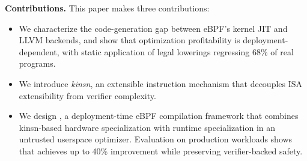 \noindent\textbf{Contributions.}
This paper makes three contributions:
\begin{itemize}
    \item We characterize the code-generation gap between eBPF's kernel JIT and LLVM backends, and show that optimization profitability is deployment-dependent, with static application of legal lowerings regressing 68\% of real programs.
    \item We introduce \emph{kinsn}, an extensible instruction mechanism that decouples ISA extensibility from verifier complexity.
    \item We design \tool, a deployment-time eBPF compilation framework that combines kinsn-based hardware specialization with runtime specialization in an untrusted userspace optimizer. Evaluation on production workloads shows that \tool achieves up to 40\% improvement while preserving verifier-backed safety.
\end{itemize}